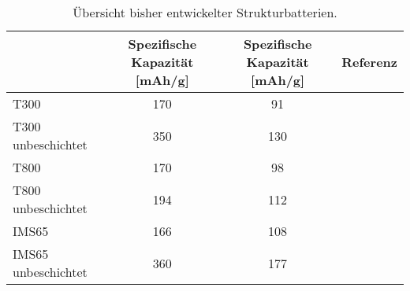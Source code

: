 \begin{table}[ht]
    \centering
    \caption{Übersicht bisher entwickelter Strukturbatterien.}
    \begin{tabular}[t]{lccc}
    \toprule
    &Spezifische Kapazität [mAh/g]&Spezifische Kapazität [mAh/g]&Referenz\\
    \midrule
    T300&170&91&\cite{Kjell2011}\\
    T300 unbeschichtet&350&130&\cite{Kjell2011}\\
    T800&170&98&\cite{Kjell2011}\\
    T800 unbeschichtet&194&112&\cite{Kjell2011}\\
    IMS65 &166&108&\cite{Kjell2011}\\
    IMS65 unbeschichtet&360&177&\cite{Kjell2011}\\
    \bottomrule
    \end{tabular}
\end{table}%